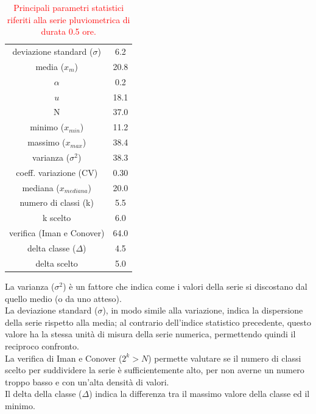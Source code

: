 \begin{table}[H] \centering
    \caption{\textcolor{red}{Principali parametri statistici riferiti alla serie pluviometrica di durata 0.5 ore.}}
 \begin{tabular}{cc}
    \toprule
deviazione standard ($\sigma$) & 6.2  \\
media ($x_m$)              & 20.8 \\
$\alpha$            & 0.2  \\
$u$           & 18.1\\
N                & 37.0 \\
minimo ($x_{min}$)             & 11.2 \\
massimo ($x_{max}$)            & 38.4 \\
varianza ($\sigma^2$)             & 38.3 \\
coeff. variazione (CV)    & 0.30 \\
mediana ($x_{mediana}$)        & 20.0 \\
numero di classi (k)      & 5.5  \\
k scelto                 & 6.0  \\
verifica (Iman e Conover) & 64.0 \\
delta classe ($\Delta$)          & 4.5  \\
delta scelto             & 5.0 \\
        \bottomrule
        \end{tabular}
\end{table}    

La varianza ($\sigma ^2$) è un fattore che indica come i valori della serie si discostano dal quello medio (o da uno atteso).\\
La deviazione standard ($\sigma$), in modo simile alla variazione, indica la dispersione della serie rispetto alla media; al contrario dell'indice statistico precedente, questo valore ha la stessa unità di misura della serie numerica, permettendo quindi il reciproco confronto.\\
La verifica di Iman e Conover ($2^k>N$) permette valutare se il numero di classi scelto per suddividere la serie è sufficientemente alto, per non averne un numero troppo basso e con un'alta densità di valori.\\
Il delta della classe ($\Delta$) indica la differenza tra il massimo valore della classe ed il minimo.

